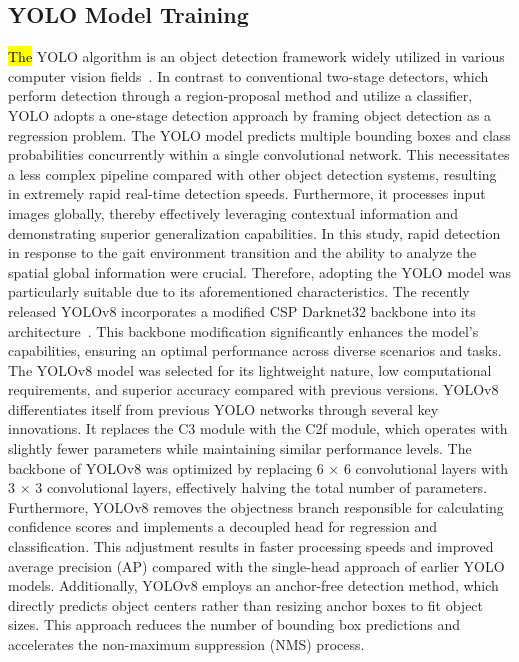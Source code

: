 \documentclass[actuators,article,accept,pdftex,moreauthors]{Definitions/mdpi}
\begin{document}
\subsection{{YOLO Model Training}} %
\hl{The }YOLO algorithm is {an} object detection framework widely utilized in various computer vision fields~\cite{Redmon2016}. In contrast to conventional two-stage detectors, which perform detection through a region-proposal method and utilize a classifier, YOLO adopts a one-stage detection approach by framing object detection as a regression problem. The YOLO model predicts multiple bounding boxes and class probabilities concurrently within a single convolutional network. This necessitates a less complex pipeline compared with other object detection systems, resulting in extremely rapid real-time detection speeds. Furthermore, it processes input images globally, thereby effectively leveraging contextual information and demonstrating superior generalization capabilities. In this study, rapid detection in response to the gait environment transition and the ability to analyze the spatial global information were crucial. Therefore, adopting the YOLO model was particularly suitable due to its aforementioned characteristics.
The recently released YOLOv8 incorporates a modified CSP Darknet32 backbone into its architecture~\cite{Terven2023}. This backbone modification significantly enhances the model's capabilities, ensuring an optimal performance across diverse scenarios and tasks. The YOLOv8 model was selected for its lightweight nature, low computational requirements, and superior accuracy compared with previous versions.
YOLOv8 differentiates itself from previous YOLO networks through several key innovations. It replaces the C3 module with the C2f module, which operates with slightly fewer parameters while maintaining similar performance levels. The backbone of YOLOv8 was optimized by replacing 6 × 6 convolutional layers with 3 × 3 convolutional layers, effectively halving the total number of parameters. %
Furthermore, YOLOv8 removes the objectness branch responsible for calculating confidence scores and implements a decoupled head for regression and classification. This adjustment results in faster processing speeds and improved average precision (AP) compared with the single-head approach of earlier YOLO models. Additionally, YOLOv8 employs an anchor-free detection method, which directly predicts object centers rather than resizing anchor boxes to fit object sizes. This approach reduces the number of bounding box predictions and accelerates the non-maximum suppression (NMS) process.
\end{document}
